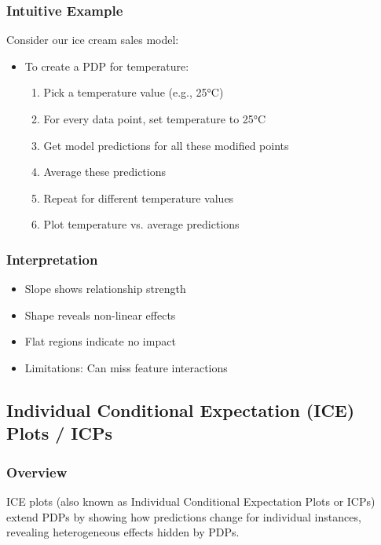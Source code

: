 \documentclass{article}
\begin{document}
\subsubsection{Intuitive Example}
Consider our ice cream sales model:
\begin{itemize}
    \item To create a PDP for temperature:
    \begin{enumerate}
        \item Pick a temperature value (e.g., 25°C)
        \item For every data point, set temperature to 25°C
        \item Get model predictions for all these modified points
        \item Average these predictions
        \item Repeat for different temperature values
        \item Plot temperature vs. average predictions
    \end{enumerate}
\end{itemize}

\subsubsection{Interpretation}
\begin{itemize}
    \item Slope shows relationship strength
    \item Shape reveals non-linear effects
    \item Flat regions indicate no impact
    \item Limitations: Can miss feature interactions
\end{itemize}

\subsection{Individual Conditional Expectation (ICE) Plots / ICPs}

\subsubsection{Overview}
ICE plots (also known as Individual Conditional Expectation Plots or ICPs) extend PDPs by showing how predictions change for individual instances, revealing heterogeneous effects hidden by PDPs.
\end{document}
